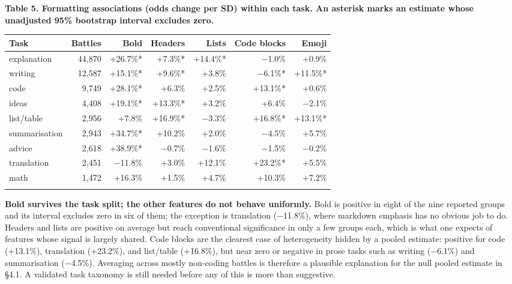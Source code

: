 \documentclass[
]{article}
\begin{document}
\begin{table}[htbp]
\textbf{Table 5. Formatting associations (odds change per SD) within
each task. An asterisk marks an estimate whose unadjusted 95\% bootstrap
interval excludes zero.}

\medskip
\centering
\footnotesize
\setlength{\tabcolsep}{4pt}
\begin{tabular}{@{}lrrrrrr@{}}
\toprule\noalign{}
Task & Battles & Bold & Headers & Lists & Code blocks & Emoji \\
\midrule\noalign{}
explanation & 44,870 & +26.7\%* & +7.3\%* & +14.4\%* & −1.0\% &
+0.9\% \\
writing & 12,587 & +15.1\%* & +9.6\%* & +3.8\% & −6.1\%* &
+11.5\%* \\
code & 9,749 & +28.1\%* & +6.3\% & +2.5\% & +13.1\%* & +0.6\% \\
ideas & 4,408 & +19.1\%* & +13.3\%* & +3.2\% & +6.4\% & −2.1\% \\
list/table & 2,956 & +7.8\% & +16.9\%* & −3.3\% & +16.8\%* &
+13.1\%* \\
summarisation & 2,943 & +34.7\%* & +10.2\% & +2.0\% & −4.5\% &
+5.7\% \\
advice & 2,618 & +38.9\%* & −0.7\% & −1.6\% & −1.5\% & −0.2\% \\
translation & 2,451 & −11.8\% & +3.0\% & +12.1\% & +23.2\%* &
+5.5\% \\
math & 1,472 & +16.3\% & +1.5\% & +4.7\% & +10.3\% & +7.2\% \\
\bottomrule\noalign{}
\end{tabular}
\end{table}

\textbf{Bold survives the task split; the other features do not behave
uniformly.} Bold is positive in eight of the nine reported groups and
its interval excludes zero in six of them; the exception is translation
(−11.8\%), where markdown emphasis has no obvious job to do. Headers and
lists are positive on average but reach conventional significance in
only a few groups each, which is what one expects of features whose
signal is largely shared. Code blocks are the clearest case of
heterogeneity hidden by a pooled estimate: positive for code (+13.1\%),
translation (+23.2\%), and list/table (+16.8\%), but near zero or
negative in prose tasks such as writing (−6.1\%) and summarisation
(−4.5\%). Averaging across mostly non-coding battles is therefore a
plausible explanation for the null pooled estimate in §4.1. A validated
task taxonomy is still needed before any of this is more than
suggestive.
\end{document}
